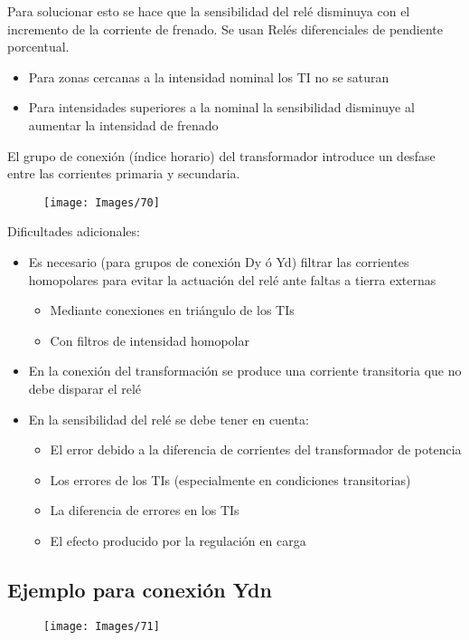 Para solucionar esto se hace que la sensibilidad del relé disminuya con el incremento de la corriente de frenado. Se usan Relés diferenciales de pendiente porcentual.
\begin{itemize}
	\item Para zonas cercanas a la intensidad
	nominal los TI no se saturan
	\item Para intensidades superiores a la
	nominal la sensibilidad disminuye al
	aumentar la intensidad de frenado
\end{itemize}

El grupo de conexión (índice horario) del transformador
introduce un desfase entre las corrientes
primaria y secundaria.
\begin{figure}[H]
	\centering
	\texttt{[image: Images/70]}
	\label{fig:70}
\end{figure}

Dificultades adicionales:
\begin{itemize}
	\item Es necesario (para grupos de conexión Dy ó Yd) filtrar las corrientes
	homopolares para evitar la actuación del relé ante faltas a tierra externas
	\begin{itemize}
		\item Mediante conexiones en triángulo de los TIs
		\item Con filtros de intensidad homopolar
	\end{itemize}
	\item En la conexión del transformación se produce una corriente transitoria que no
	debe disparar el relé
	\item En la sensibilidad del relé se debe tener en cuenta:
	\begin{itemize}
		\item El error debido a la diferencia de corrientes del transformador de potencia
		\item Los errores de los TIs (especialmente en condiciones transitorias)
		\item La diferencia de errores en los TIs
		\item El efecto producido por la regulación en carga
	\end{itemize}
\end{itemize}
\subsection{Ejemplo para conexión Ydn}
\begin{figure}[H]
	\centering
	\texttt{[image: Images/71]}
	\label{fig:71}
\end{figure}


